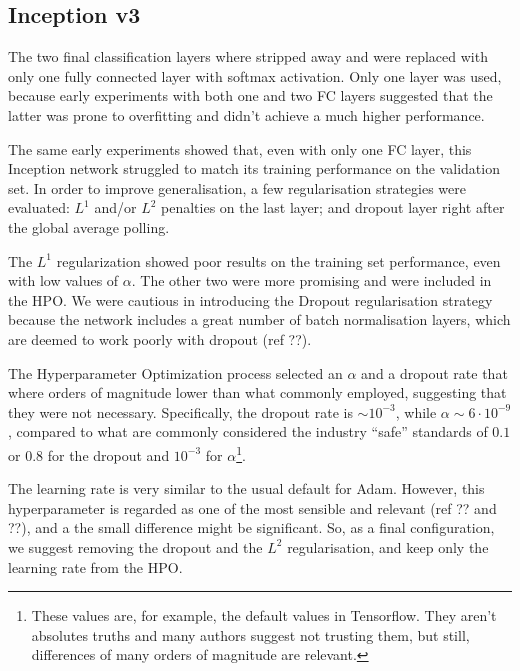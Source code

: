 \subsection{Inception v3}
The two final classification layers where stripped away and were replaced with only one fully connected layer with softmax activation. Only one layer was used, because early experiments with both one and two FC layers suggested that the latter was prone to overfitting and didn't achieve a much higher performance.

The same early experiments showed that, even with only one FC layer, this Inception network struggled to match its training performance on the validation set. In order to improve generalisation, a few regularisation strategies were evaluated: $L^1$ and/or $L^2$ penalties on the last layer; and dropout layer right after the global average polling.

The $L^1$ regularization showed poor results on the training set performance, even with low values of $\alpha$. The other two were more promising and were included in the HPO. We were cautious in introducing the Dropout regularisation strategy because the network includes a great number of batch normalisation layers, which are deemed to work poorly with dropout (ref ??).

The Hyperparameter Optimization process selected an $\alpha$ and a dropout rate that where orders of magnitude lower than what commonly employed, suggesting that they were not necessary. Specifically, the dropout rate is $\sim 10^{-3}$, while $\alpha\sim 6\cdot 10^{-9}$, compared to what are commonly considered the industry ``safe'' standards of $0.1$ or $0.8$ for the dropout and $10^{-3}$ for $\alpha$\footnote{These values are, for example, the default values in Tensorflow. They aren't absolutes truths and many authors suggest not trusting them, but still, differences of many orders of magnitude are relevant.}.

The learning rate is very similar to the usual default for Adam. However, this hyperparameter is regarded as one of the most sensible and relevant (ref ?? and ??), and a the small difference might be significant. So, as a final configuration, we suggest removing the dropout and the $L^2$ regularisation, and keep only the learning rate from the HPO.

